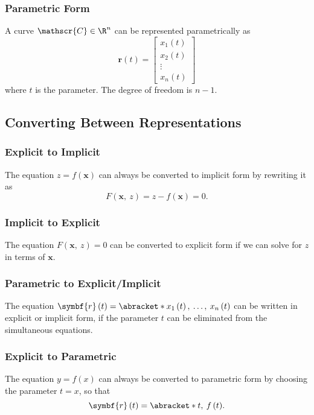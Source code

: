 \documentclass{article}
\begin{document}
\subsubsection{Parametric Form}
A curve \(\mathscr{C} \in \R^n\) can be represented parametrically as
\begin{equation*}
    \symbf{r}\left( t \right) =
    \begin{bmatrix}
        x_1\left( t \right) \\
        x_2\left( t \right) \\
        \vdots              \\
        x_n\left( t \right)
    \end{bmatrix}
\end{equation*}
where \(t\) is the parameter. The degree of freedom is \(n - 1\).
\subsection{Converting Between Representations}
\subsubsection{Explicit to Implicit}
The equation \(z = f\left( \symbf{x} \right)\) can always be converted
to implicit form by rewriting it as
\begin{equation*}
    F\left( \symbf{x},\: z \right) = z - f\left( \symbf{x} \right) = 0.
\end{equation*}
\subsubsection{Implicit to Explicit}
The equation \(F\left( \symbf{x},\: z \right) = 0\) can be converted to
explicit form if we can solve for \(z\) in terms of \(\symbf{x}\).
\subsubsection{Parametric to Explicit/Implicit}
The equation \(\symbf{r}\left( t \right) = \abracket*{x_1\left( t
\right),\: \dots,\: x_n\left( t \right)}\) can be written in explicit
or implicit form, if the parameter \(t\) can be eliminated from the
simultaneous equations.
\subsubsection{Explicit to Parametric}
The equation \(y = f\left( x \right)\) can always be converted to
parametric form by choosing the parameter \(t = x\), so that
\begin{equation*}
    \symbf{r}\left( t \right) = \abracket*{t,\: f\left( t \right)}.
\end{equation*}
\end{document}

